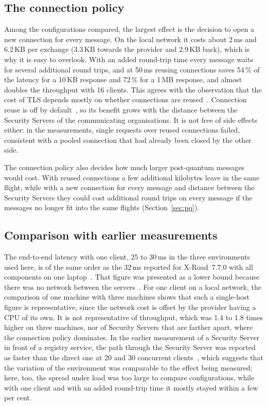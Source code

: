 \documentclass[conference,a4paper]{IEEEtran}
\begin{document}
\subsection{The connection policy}

Among the configurations compared, the largest effect is the decision to open a new connection for
every message. On the local network it costs about 2\,ms and 6.2\,KB per exchange (3.3\,KB towards the provider
and 2.9\,KB back),
which is why it is easy to overlook. With an added round-trip time every message waits for several
additional round trips, and at 50\,ms reusing connections saves 54\,\% of the latency for a 10\,KB
response and 72\,\% for a 1\,MB response, and almost doubles the throughput with 16 clients. This
agrees with the observation that the cost of TLS depends mostly on whether connections are
reused~\cite{naylor2014}. Connection reuse is off by default~\cite{xroadsyspar}, so its benefit grows
with the distance between the Security Servers of the communicating organisations. It is not free of
side effects either: in the measurements, single requests over reused connections failed, consistent
with a pooled connection that had already been closed by the other side.

The connection policy also decides how much larger post-quantum messages would cost. With reused
connections a few additional kilobytes leave in the same flight, while with a new connection for
every message and distance between the Security Servers they could cost additional round trips on
every message if the messages no longer fit into the same flights (Section~\ref{sec:pq}).

\subsection{Comparison with earlier measurements}

The end-to-end latency with one client, 25 to 30\,ms in the three environments used here, is of the same
order as the 32\,ms reported for X-Road~7.7.0 with all components on one laptop~\cite{bakhtina2026ijis}.
That figure was presented as a lower bound because there was no network between the
servers~\cite{bakhtina2026ijis}. For one client on a local network, the comparison of one machine with
three machines shows that such a single-host figure is representative, since the network cost is
offset by the provider having a CPU of its own. It is not representative of throughput, which was
1.4 to 1.8 times higher on three machines, nor of Security Servers that are farther apart, where the
connection policy dominates. In the earlier measurement of a Security Server in front of a registry
service, the path through the Security Server was reported as faster than the direct one at 20 and 30
concurrent clients~\cite{taklai2020}, which suggests that the variation of the environment was
comparable to the effect being measured; here, too, the spread under load was too large to compare
configurations, while with one
client and with an added round-trip time it mostly stayed within a few per cent.
\end{document}
